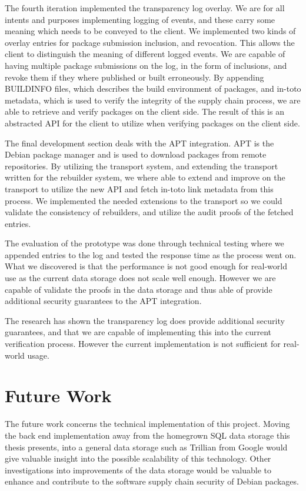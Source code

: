 \documentclass[../Main/thesis.tex]{subfiles}
\begin{document}
The fourth iteration implemented the transparency log overlay. We are for all
intents and purposes implementing logging of events, and these carry some
meaning which needs to be conveyed to the client. We implemented two kinds of
overlay entries for package submission inclusion, and revocation. This allows
the client to distinguish the meaning of different logged events. We are capable
of having multiple package submissions on the log, in the form of inclusions,
and revoke them if they where published or built erroneously. By appending
BUILDINFO files, which describes the build environment of packages, and in-toto
metadata, which is used to verify the integrity of the supply chain process, we
are able to retrieve and verify packages on the client side.  The result of this
is an abstracted API for the client to utilize when verifying packages on the
client side.

The final development section deals with the APT integration. APT is the Debian
package manager and is used to download packages from remote repositories. By
utilizing the transport system, and extending the transport written for the
rebuilder system, we where able to extend and improve on the transport to
utilize the new API and fetch in-toto link metadata from this process. We
implemented the needed extensions to the transport so we could validate the
consistency of rebuilders, and utilize the audit proofs of the fetched entries.

The evaluation of the prototype was done through technical testing where we
appended entries to the log and tested the response time as the process went on.
What we discovered is that the performance is not good enough for real-world use
as the current data storage does not scale well enough. However we are capable
of validate the proofs in the data storage and thus able of provide additional
security guarantees to the APT integration.

The research has shown the transparency log does provide additional security
guarantees, and that we are capable of implementing this into the current
verification process. However the current implementation is not sufficient for
real-world usage.

\section{Future Work}%
\label{sec:future_work}
The future work concerns the technical implementation of this project.
Moving the back end implementation away from the homegrown SQL data storage this
thesis presents, into a general data storage such as Trillian from Google would
give valuable insight into the possible scalability of this technology. Other
investigations into improvements of the data storage would be valuable to
enhance and contribute to the software supply chain security of Debian packages.
\end{document}
